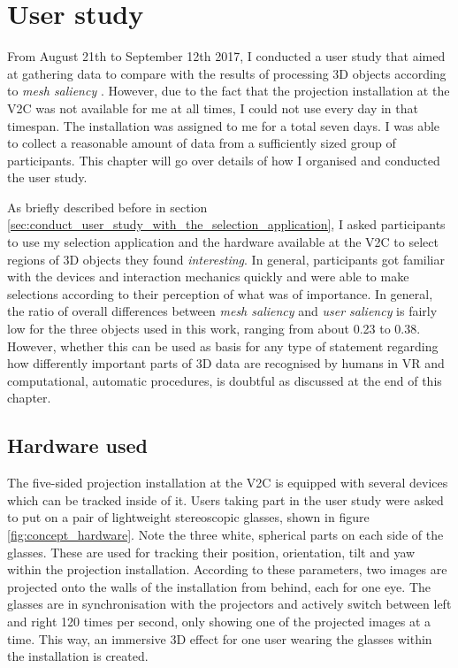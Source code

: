 \chapter{User study}
\label{sec:user_study_chapter}
%
%

From August 21th to September 12th 2017, I conducted a user study that aimed at gathering data to compare with the results of processing 3D objects according to \textit{mesh saliency} \cite{lee2005mesh}. However, due to the fact that the projection installation at the V2C was not available for me at all times, I could not use every day in that timespan. The installation was assigned to me for a total seven days. I was able to collect a reasonable amount of data from a sufficiently sized group of participants. This chapter will go over details of how I organised and conducted the user study.

As briefly described before in section \ref{sec:conduct_user_study_with_the_selection_application}, I asked participants to use my selection application and the hardware available at the V2C to select regions of 3D objects they found \textit{interesting}. In general, participants got familiar with the devices and interaction mechanics quickly and were able to make selections according to their perception of what was of importance. In general, the ratio of overall differences between \textit{mesh saliency} and \textit{user saliency} is fairly low for the three objects used in this work, ranging from about 0.23 to 0.38. However, whether this can be used as basis for any type of statement regarding how differently important parts of 3D data are recognised by humans in VR and computational, automatic procedures, is doubtful as discussed at the end of this chapter.

	\section{Hardware used}
	\label{sec:hardware_used}
%
%

The five-sided projection installation at the V2C is equipped with several devices which can be tracked inside of it. Users taking part in the user study were asked to put on a pair of lightweight stereoscopic glasses, shown in figure \ref{fig:concept_hardware}. Note the three white, spherical parts on each side of the glasses. These are used for tracking their position, orientation, tilt and yaw within the projection installation. According to these parameters, two images are projected onto the walls of the installation from behind, each for one eye. The glasses are in synchronisation with the projectors and actively switch between left and right 120 times per second, only showing one of the projected images at a time. This way, an immersive 3D effect for one user wearing the glasses within the installation is created.  

